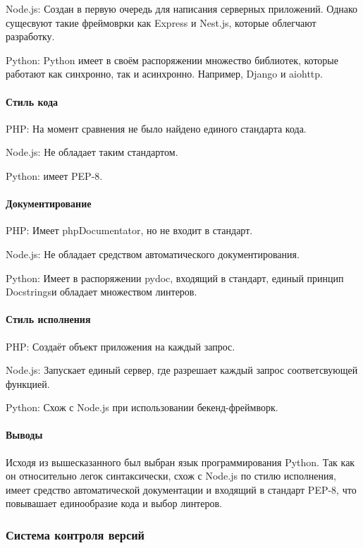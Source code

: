 Node.js: Создан в первую
очередь для 
написания
серверных 
приложений. Однако сущесвуют такие фреймоврки как Express и Nest.js, которые облегчают разработку.

Python: Python имеет в
своём распоряжении
множество библиотек,
которые работают как
синхронно, так 
и асинхронно. Например, Django и aiohttp.

\paragraph{Стиль кода}

PHP: На момент сравнения
не было найдено
единого стандарта кода.

Node.js: Не обладает таким
стандартом.

Python: имеет PEP-8.

\paragraph{Документирование}

PHP: Имеет phpDocumentator,
но не входит в стандарт.

Node.js: Не обладает 
средством
автоматического 
документирования.

Python: Имеет в распоряжении 
pydoc, входящий в 
стандарт, 
единый принцип 
Docstringsи обладает
множеством линтеров.

\paragraph{Стиль исполнения}

PHP: Создаёт объект
приложения на каждый
запрос.

Node.js: Запускает единый 
сервер, где 
разрешает 
каждый запрос
соответсвующей
функцией.

Python: Схож с Node.js при использовании бекенд-фреймворк.

\paragraph{Выводы}

Исходя из вышесказанного был выбран язык программирования Python. Так как он относительно легок синтаксически, схож с Node.js по стилю исполнения,
имеет средство автоматической документации и входящий в стандарт PEP-8, что повывашает единообразие кода и выбор линтеров.

\subsubsection{Система контроля версий}

